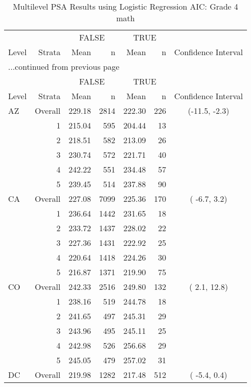 \begin{longtable}{lrrr@{\extracolsep{.25cm}}rrc}
\caption{Multilevel PSA Results using Logistic Regression AIC: Grade 4 math} \\ 
   \hline & & \multicolumn{2}{c}{FALSE} & \multicolumn{2}{c}{TRUE} & \\ \cline{3-4} \cline{5-6} Level & Strata & Mean & n & Mean & n & Confidence Interval \\ \hline\endfirsthead \multicolumn{7}{l}{{...continued from previous page}}\\ \hline  & & \multicolumn{2}{c}{FALSE} & \multicolumn{2}{c}{TRUE} & \\ \cline{3-4} \cline{5-6} Level & Strata & Mean & n & Mean & n & Confidence Interval \\ \hline \endhead \endfoot \endlastfoot  \hline
AZ & Overall & 229.18 & 2814 & 222.30 & 226 & (-11.5,  -2.3) \\ 
   & 1 & 215.04 & 595 & 204.44 &  13 &  \\ 
   & 2 & 218.51 & 582 & 213.09 &  26 &  \\ 
   & 3 & 230.74 & 572 & 221.71 &  40 &  \\ 
   & 4 & 242.22 & 551 & 234.48 &  57 &  \\ 
   & 5 & 239.45 & 514 & 237.88 &  90 &  \\ 
   \hline
CA & Overall & 227.08 & 7099 & 225.36 & 170 & ( -6.7,   3.2) \\ 
   & 1 & 236.64 & 1442 & 231.65 &  18 &  \\ 
   & 2 & 233.72 & 1437 & 228.02 &  22 &  \\ 
   & 3 & 227.36 & 1431 & 222.92 &  25 &  \\ 
   & 4 & 220.64 & 1418 & 224.26 &  30 &  \\ 
   & 5 & 216.87 & 1371 & 219.90 &  75 &  \\ 
   \hline
CO & Overall & 242.33 & 2516 & 249.80 & 132 & (  2.1,  12.8) \\ 
   & 1 & 238.16 & 519 & 244.78 &  18 &  \\ 
   & 2 & 241.65 & 497 & 245.31 &  29 &  \\ 
   & 3 & 243.96 & 495 & 245.11 &  25 &  \\ 
   & 4 & 242.98 & 526 & 256.68 &  29 &  \\ 
   & 5 & 245.05 & 479 & 257.02 &  31 &  \\ 
   \hline
DC & Overall & 219.98 & 1282 & 217.48 & 512 & ( -5.4,   0.4) \\ 

\end{longtable}
